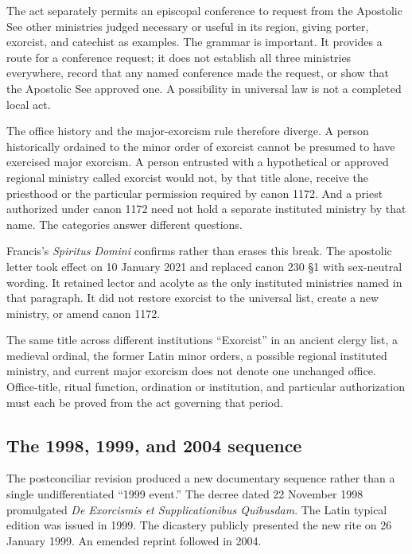 The act separately permits an episcopal conference to request from the
Apostolic See other ministries judged necessary or useful in its region,
giving porter, exorcist, and catechist as examples. The grammar is important.
It provides a route for a conference request; it does not establish all three
ministries everywhere, record that any named conference made the request, or
show that the Apostolic See approved one. A possibility in universal law is
not a completed local act.

The office history and the major-exorcism rule therefore diverge. A person
historically ordained to the minor order of exorcist cannot be presumed to
have exercised major exorcism. A person entrusted with a hypothetical or
approved regional ministry called exorcist would not, by that title alone,
receive the priesthood or the particular permission required by canon 1172.
And a priest authorized under canon 1172 need not hold a separate instituted
ministry by that name. The categories answer different questions.

Francis's \emph{Spiritus Domini} confirms rather than erases this break. The
apostolic letter took effect on 10 January 2021 and replaced canon 230 \S1
with sex-neutral wording. It retained lector and acolyte as the only
instituted ministries named in that paragraph. It did not restore exorcist to
the universal list, create a new ministry, or amend canon 1172.

\begin{studybox}{The same title across different institutions}
``Exorcist'' in an ancient clergy list, a medieval ordinal, the former Latin
minor orders, a possible regional instituted ministry, and current major
exorcism does not denote one unchanged office. Office-title, ritual function,
ordination or institution, and particular authorization must each be proved
from the act governing that period.
\end{studybox}

\subsection{The 1998, 1999, and 2004 sequence}

The postconciliar revision produced a new documentary sequence rather than a
single undifferentiated ``1999 event.'' The decree dated 22 November 1998
promulgated \emph{De Exorcismis et Supplicationibus Quibusdam}. The Latin
typical edition was issued in 1999. The dicastery publicly presented the new
rite on 26 January 1999. An emended reprint followed in 2004.

